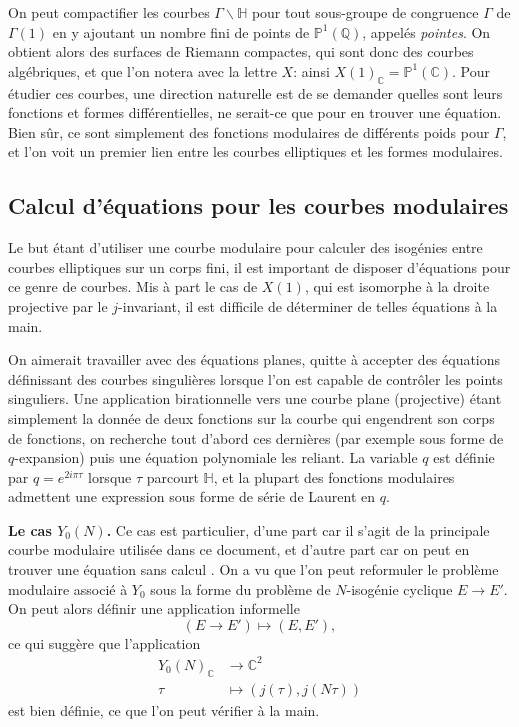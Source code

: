 \documentclass[11pt,a4paper]{article}
\newcommand{\C}{\mathbb{C}}
\newcommand{\Q}{\mathbb{Q}}
\renewcommand{\H}{\mathbb{H}}
\renewcommand{\P}{\mathbb{P}}
\renewcommand{\b}{\backslash}
\newcommand{\vers}{\longrightarrow}
\renewcommand{\v}{\vspace{5mm}}
\theoremstyle{definition}
\begin{document}
\v


On peut compactifier les courbes $\Gamma \b\H$ pour tout sous-groupe de congruence $\Gamma$ de $\Gamma(1)$ en y ajoutant un nombre fini de points de $\P^1(\Q)$, appelés \emph{pointes}. On obtient alors des surfaces de Riemann compactes, qui sont donc des courbes algébriques, et que l'on notera avec la lettre $X$: ainsi $X(1)_\C = \P^1(\C)$. Pour étudier ces courbes, une direction naturelle est de se demander quelles sont leurs fonctions et formes différentielles, ne serait-ce que pour en trouver une équation. Bien sûr, ce sont simplement des fonctions modulaires de différents poids pour $\Gamma$, et l'on voit un premier lien entre les courbes elliptiques et les formes modulaires.

\subsection{Calcul d'équations pour les courbes modulaires}


Le but étant d'utiliser une courbe modulaire pour calculer des isogénies entre courbes elliptiques sur un corps fini, il est important de disposer d'équations pour ce genre de courbes. Mis à part le cas de $X(1)$, qui est isomorphe à la droite projective par le $j$-invariant, il est difficile de déterminer de telles équations à la main.

On aimerait travailler avec des équations planes, quitte à accepter des équations définissant des courbes singulières lorsque l'on est capable de contrôler les points singuliers. Une application birationnelle vers une courbe plane (projective) étant simplement la donnée de deux fonctions sur la courbe qui engendrent son corps de fonctions, on recherche tout d'abord ces dernières (par exemple sous forme de $q$-expansion) puis une équation polynomiale les reliant. La variable $q$ est définie par $q = e^{2i\pi\tau}$ lorsque $\tau$ parcourt $\H$, et la plupart des fonctions modulaires admettent une expression sous forme de série de Laurent en $q$.
\v

\textbf{Le cas $Y_0(N)$.} Ce cas est particulier, d'une part car il s'agit de la principale courbe modulaire utilisée dans ce document, et d'autre part car on peut en trouver une équation \og sans calcul \fg. On a vu que l'on peut reformuler le problème modulaire associé à $Y_0$ sous la forme du problème de $N$-isogénie cyclique $E\to E'$. On peut alors définir une application informelle
$$(E\to E') \longmapsto (E, E'),$$
ce qui suggère que l'application
$$\begin{aligned}
Y_0(N)_\C &\vers \C^2 \\
 \tau &\longmapsto (j(\tau), j(N\tau))
\end{aligned}$$
est bien définie, ce que l'on peut vérifier à la main.
\end{document}
